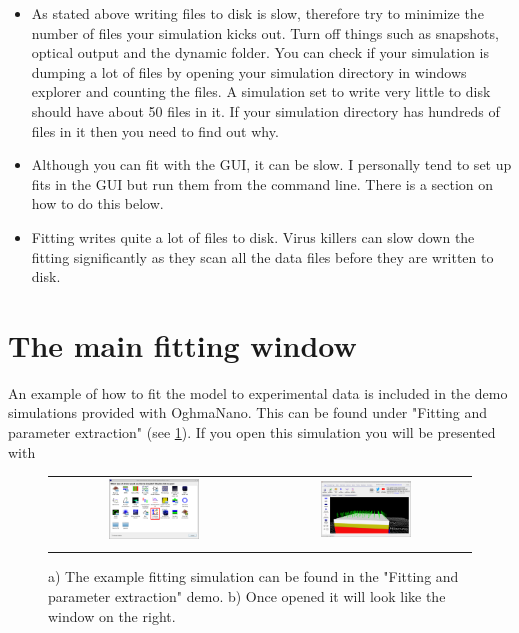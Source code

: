 \begin{itemize}
  \item As stated above writing files to disk is slow, therefore try to minimize the number of files your simulation kicks out. Turn off things such as snapshots, optical output and the dynamic folder.  You can check if your simulation is dumping a lot of files by opening your simulation directory in windows explorer and counting the files.  A simulation set to write very little to disk should have about 50 files in it. If your simulation directory has hundreds of files in it then you need to find out why.
 \item Although you can fit with the GUI, it can be slow. I personally tend to set up fits in the GUI but run them from the command line. There is a section on how to do this below.
 \item Fitting writes quite a lot of files to disk. Virus killers can slow down the fitting significantly as they scan all the data files before they are written to disk.   
\end{itemize}

\section{The main fitting window}

An example of how to fit the model to experimental data is included in the demo simulations provided with OghmaNano. This can be found under "Fitting and parameter extraction" (see \ref{fig:fit_new_sim}). If you open this simulation you will be presented with


\begin{figure}[H]
\centering
\begin{tabular}{ c c }

\includegraphics[width=0.45\textwidth]{./images/fit/example.png}
&
\includegraphics[width=0.45\textwidth]{./images/fit/main_window.png}
\\
\label{fig:fit_new_sim}
\end{tabular}
\caption{a) The example fitting simulation can be found in the "Fitting and parameter extraction" demo. b) Once opened it will look like the window on the right.}
\end{figure}

